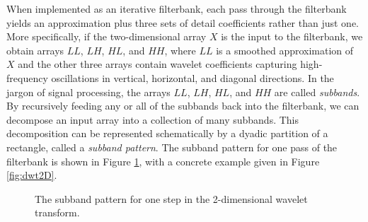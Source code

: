 When implemented as an iterative filterbank, each pass through the filterbank yields an approximation plus three sets of detail coefficients
rather than just one.
More specifically, if the two-dimensional array $X$ is the input to the filterbank, we obtain arrays $LL$, $LH$, $HL$, and $HH$,
where $LL$ is a smoothed approximation of $X$ and the other three arrays contain wavelet coefficients capturing high-frequency
oscillations in vertical, horizontal, and diagonal directions.
In the jargon of signal processing, the arrays $LL$, $LH$, $HL$, and $HH$ are called \emph{subbands}.
By recursively feeding any or all of the subbands back into the filterbank, we can decompose an input array into a collection
of many subbands.
This decomposition can be represented schematically by a dyadic partition of a rectangle, called a \emph{subband pattern}.
The subband pattern for one pass of the filterbank is shown in Figure \ref{fig:2dsubbands}, with a concrete example given in Figure \ref{fig:dwt2D}.
\begin{figure}[H]
\caption{The subband pattern for one step in the 2-dimensional wavelet transform.}
\label{fig:2dsubbands}
\end{figure}
